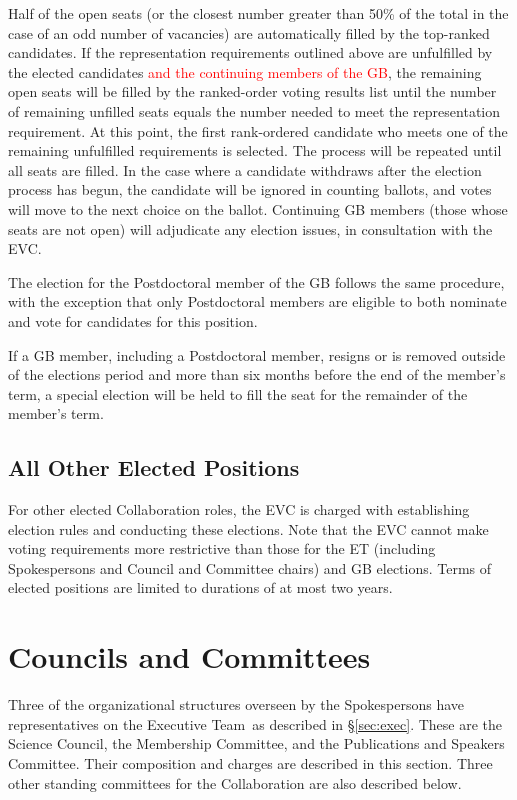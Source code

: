 \documentclass[12pt]{article}
\newcommand{\exec}{{Executive Team}}
\begin{document}
Half of the open seats (or the closest number greater than 50\% of the total in the case of an odd number of vacancies) are automatically filled by the top-ranked candidates. If the representation requirements outlined above are unfulfilled by the elected candidates \textcolor{red}{and the continuing members of the GB}, the remaining open seats will be filled by the ranked-order voting results list until the number of remaining unfilled seats equals the number needed to meet the representation requirement.  At this point, the first rank-ordered candidate who meets one of the remaining unfulfilled requirements is selected. The process will be repeated until all seats are filled. In the case where a candidate withdraws after the election process has begun, the candidate will be ignored in counting ballots, and votes will move to the next choice on the ballot. Continuing GB members (those whose seats are not open) will adjudicate any election issues, in consultation with the EVC.

The election for the Postdoctoral member of the GB follows the same procedure, with the exception that only Postdoctoral members are eligible to both nominate and vote for candidates for this position.

If a GB member, including a Postdoctoral member, resigns or is removed outside of the elections period and more than six months before the end of the member's term, a special election will be held to fill the seat for the remainder of the member's term.

\subsection{All Other Elected Positions}

For other elected Collaboration roles, the EVC is charged with establishing election rules and conducting these elections. Note that the EVC cannot make voting requirements more restrictive than those for the ET (including Spokespersons and Council and Committee chairs) and GB elections. Terms of elected positions are limited to durations of at most two years. 

\section{Councils and Committees}
\label{sec:councils}

Three of the organizational structures overseen by the Spokespersons have representatives on the \exec\ as described in \S\ref{sec:exec}.  These are the Science Council, the Membership Committee, and the Publications and Speakers Committee.  Their composition and charges are described in this section.  Three other standing committees for the Collaboration are also described below.  
\end{document}
